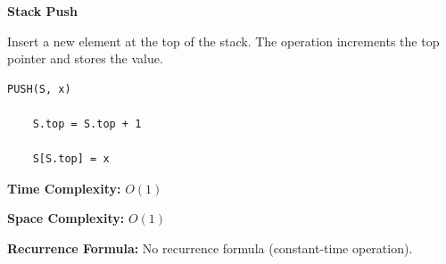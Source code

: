 \documentclass[a4paper,12pt]{article}
\begin{document}
\begin{tcolorbox}[
    colback=gray!30,
    colframe=black,
    boxrule=1pt,
    arc=0mm
]

\begin{tcolorbox}[
    colback=gray!10,
    colframe=black,
    arc=0mm
]
\centering
{\Huge\bfseries Stack Push}
\end{tcolorbox}


\begin{tcolorbox}[
    colback=gray!10,
    colframe=black,
    arc=0mm
]
\small
Insert a new element at the top of the stack.
The operation increments the top pointer and stores the value.
\end{tcolorbox}


\begin{tcolorbox}[
    colback=black!5,
    colframe=black,
    arc=0mm,
    title=Pseudo-code
]
\tiny
\begin{lstlisting}
PUSH(S, x)

    S.top = S.top + 1

    S[S.top] = x
\end{lstlisting}
\end{tcolorbox}


\begin{tcolorbox}[
    colback=cyan!20,
    colframe=black,
    arc=0mm
]
\small
\textbf{Time Complexity:}
$O(1)$
\end{tcolorbox}


\begin{tcolorbox}[
    colback=violet!20,
    colframe=black,
    arc=0mm
]
\small
\textbf{Space Complexity:}
$O(1)$
\end{tcolorbox}


\begin{tcolorbox}[
    colback=pink!20,
    colframe=black,
    arc=0mm
]
\small
\textbf{Recurrence Formula:}
No recurrence formula (constant-time operation).
\end{tcolorbox}

\end{tcolorbox}
\end{document}
